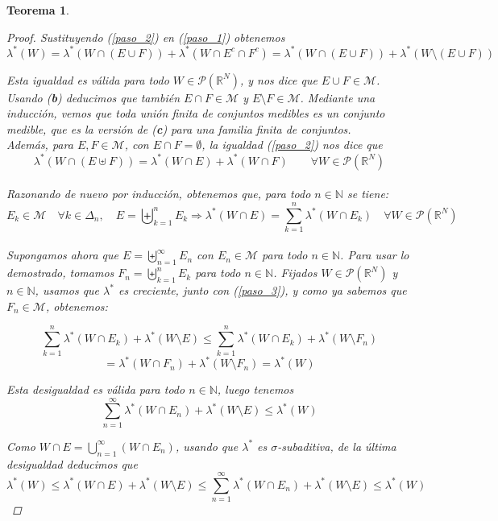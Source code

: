 \documentclass[a4paper, 12pt]{article}
\newtheorem{teorema}{Teorema}
\begin{document}
\begin{enumerate}[label=\textbf{\arabic*}.]
\begin{teorema}
\begin{proof}
Sustituyendo (\ref{paso_2}) en (\ref{paso_1}) obtenemos
\[
	\lambda^*(W) = \lambda^* (W \cap (E \cup F)) + \lambda^* (W \cap E^c \cap F^c) = \lambda^* (W \cap (E \cup F)) + \lambda^* (W \setminus (E \cup F))
\]

Esta igualdad es válida para todo \(W \in \mathcal{P} (\mathbb{R}^N)\), y nos dice que \(E \cup F \in \mathcal{M}\). Usando (\textbf{b}) deducimos que también \(E \cap F \in \mathcal{M}\) y \(E \setminus F \in \mathcal{M}\). Mediante una inducción, vemos que toda unión finita de conjuntos medibles es un conjunto medible, que es la versión de (\textbf{c}) para una familia finita de conjuntos. \\

Además, para \(E,F \in \mathcal{M}\), con \(E \cap F = \emptyset\), la igualdad (\ref{paso_2}) nos dice que
\[
	\lambda^*(W \cap (E \uplus F)) = \lambda^* (W \cap E) + \lambda^*(W \cap F) \qquad \forall W \in \mathcal{P} (\mathbb{R}^N)
\] \\

Razonando de nuevo por inducción, obtenemos que, para todo \(n \in \mathbb{N}\) se tiene:
\begin{equation}\label{paso_3}
E_k \in \mathcal{M} \quad \forall k \in \Delta_n, \quad E = \biguplus_{k=1}^{n} E_k \Longrightarrow \lambda^* (W \cap E) = \sum_{k=1}^{n} \lambda^*(W \cap E_k) \quad \forall W \in \mathcal{P} (\mathbb{R}^N)
\end{equation} \\

Supongamos ahora que \(E = \biguplus_{n=1}^{\infty} E_n\) con \(E_n \in \mathcal{M}\) para todo \(n \in \mathbb{N}\). Para usar lo demostrado, tomamos \(F_n = \biguplus_{k=1}^{n} E_k\) para todo \(n \in \mathbb{N}\). Fijados \(W \in \mathcal{P} (\mathbb{R}^N)\) y \(n \in \mathbb{N}\), usamos que \(\lambda^*\) es creciente, junto con (\ref{paso_3}), y como ya sabemos que \(F_n \in \mathcal{M}\), obtenemos:

\[
	\sum_{k=1}^{n} \lambda^* (W \cap E_k) + \lambda^* (W \setminus E)  \leq \sum_{k=1}^{n} \lambda^*(W \cap E_k) + \lambda^* (W \setminus F_n) 
\]
\[
	= \lambda^* (W \cap F_n) + \lambda^*(W \setminus F_n) = \lambda^*(W)
\]

Esta desigualdad es válida para todo \(n \in \mathbb{N}\), luego tenemos
\[
	\sum_{n=1}^{\infty} \lambda^* (W \cap E_n) + \lambda^*(W \setminus E) \leq \lambda^*(W)
\]

Como \(W \cap E = \bigcup_{n=1}^{\infty} (W \cap E_n)\), usando que \(\lambda^*\) es \(\sigma\)-subaditiva, de la última desigualdad deducimos que
\[
	\lambda^*(W) \leq \lambda^* (W \cap E) + \lambda^*(W \setminus E) \leq \sum_{n=1}^{\infty} \lambda^*(W \cap E_n) + \lambda^*(W \setminus E) \leq \lambda^*(W)
\]


\end{proof}
\end{teorema}
\end{enumerate}
\end{document}
